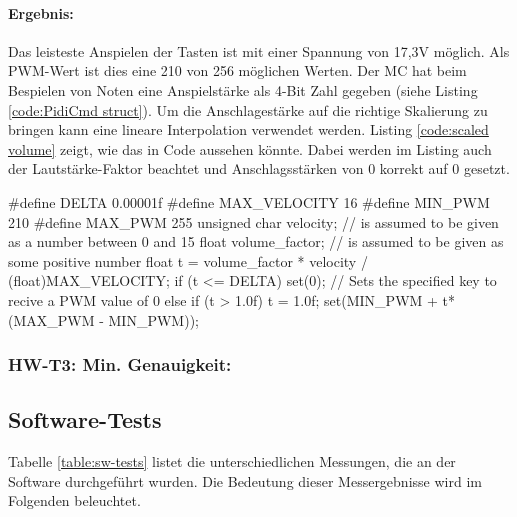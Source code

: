 \paragraph{Ergebnis:}
Das leisteste Anspielen der Tasten ist mit einer Spannung von 17,3V möglich.
Als \ac{PWM}-Wert ist dies eine 210 von 256 möglichen Werten.
Der \ac{MC} hat beim Bespielen von Noten eine Anspielstärke als 4-Bit Zahl gegeben (siehe Listing \ref{code:PidiCmd struct}).
Um die Anschlagestärke auf die richtige Skalierung zu bringen kann eine lineare Interpolation verwendet werden.
Listing \ref{code:scaled volume} zeigt, wie das in Code aussehen könnte.
Dabei werden im Listing auch der Lautstärke-Faktor beachtet und Anschlagsstärken von 0 korrekt auf 0 gesetzt.

\begin{UnbrokenCodePage}[style=CStyle, caption={Skalierung der Lautstärke bei der Ausgabe}, label={code:scaled volume}]
#define DELTA 0.00001f
#define MAX_VELOCITY 16
#define MIN_PWM 210
#define MAX_PWM 255
unsigned char velocity; // is assumed to be given as a number between 0 and 15
float volume_factor;    // is assumed to be given as some positive number
float t = volume_factor * velocity / (float)MAX_VELOCITY;
if (t <= DELTA) {
	set(0); // Sets the specified key to recive a PWM value of 0
} else {
	if (t > 1.0f) t = 1.0f;
	set(MIN_PWM + t*(MAX_PWM - MIN_PWM));
}
\end{UnbrokenCodePage}


\subsubsection{HW-T3: Min. Genauigkeit:}




\subsection{Software-Tests} \label{tests-sw}

Tabelle \ref{table:sw-tests} listet die unterschiedlichen Messungen, die an der Software durchgeführt wurden.
Die Bedeutung dieser Messergebnisse wird im Folgenden beleuchtet.

